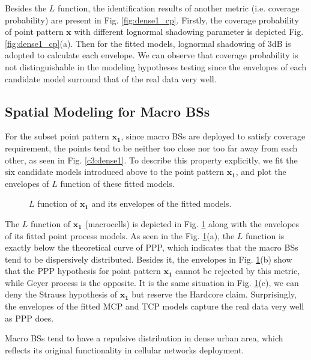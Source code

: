 Besides the $L$ function, the identification results of another metric (i.e. coverage probability) are present in Fig. \ref{fig:dense1_cp}. Firstly, the coverage probability of point pattern $\mathbf{x}$ with different lognormal shadowing parameter is depicted Fig. \ref{fig:dense1_cp}(a). Then for the fitted models, lognormal shadowing of 3dB is adopted to calculate each envelope. We can observe that coverage probability is not distinguishable in the modeling hypotheses testing since the envelopes of each candidate model surround that of the real data very well.

\subsection*{Spatial Modeling for Macro BSs}
For the subset point pattern $\mathbf{x_1}$, since macro BSs are deployed to satisfy coverage requirement, the points tend to be neither too close nor too far away from each other, as seen in Fig. \ref{c3:dense1}. To describe this property explicitly, we fit the six candidate models introduced above to the point pattern $\mathbf{x_1}$, and plot the envelopes of $L$ function of these fitted models.

\begin{figure} [!htb]
\centering
 \hspace{1in}
\caption{$L$ function of $\mathbf{x_1}$ and its envelopes of the fitted models.}
\label{fig:macro_l}
\end{figure}


The $L$ function of $\mathbf{x_1}$ (macrocells) is depicted in Fig. \ref{fig:macro_l} along with the envelopes of its fitted point process models. As seen in the Fig. \ref{fig:macro_l}(a), the $L$ function is exactly below the theoretical curve of PPP, which indicates that the macro BSs tend to be dispersively distributed. Besides it, the envelopes in Fig. \ref{fig:macro_l}(b) show that the PPP hypothesis for point pattern $\mathbf{x_1}$ cannot be rejected by this metric, while Geyer process is the opposite. It is the same situation in Fig. \ref{fig:macro_l}(c), we can deny the Strauss hypothesis of $\mathbf{x_1}$ but reserve the Hardcore claim. Surprisingly, the envelopes of the fitted MCP and TCP models capture the real data very well as PPP does.
\begin{remark}
Macro BSs tend to have a repulsive distribution in dense urban area, which reflects its original functionality in cellular networks deployment.
\end{remark}
